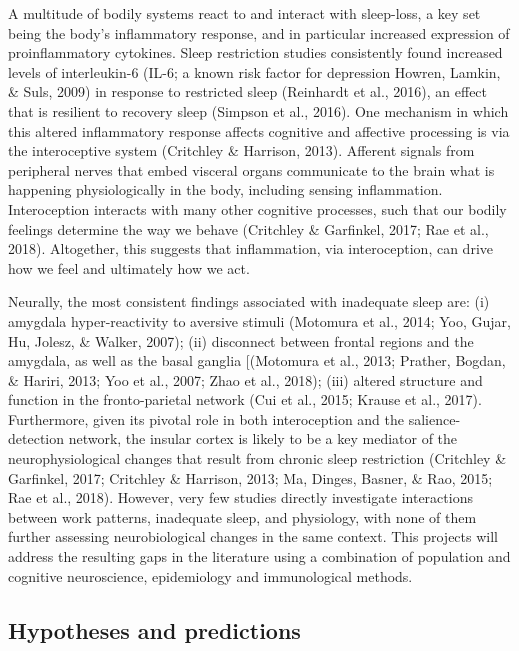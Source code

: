\documentclass[
  english,
  man]{apa6}
\begin{document}
A multitude of bodily systems react to and interact with sleep-loss, a key set being the body's inflammatory response, and in particular increased expression of proinflammatory cytokines. Sleep restriction studies consistently found increased levels of interleukin-6 (IL-6; a known risk factor for depression Howren, Lamkin, \& Suls, 2009) in response to restricted sleep (Reinhardt et al., 2016), an effect that is resilient to recovery sleep (Simpson et al., 2016). One mechanism in which this altered inflammatory response affects cognitive and affective processing is via the interoceptive system (Critchley \& Harrison, 2013). Afferent signals from peripheral nerves that embed visceral organs communicate to the brain what is happening physiologically in the body, including sensing inflammation. Interoception interacts with many other cognitive processes, such that our bodily feelings determine the way we behave (Critchley \& Garfinkel, 2017; Rae et al., 2018). Altogether, this suggests that inflammation, via interoception, can drive how we feel and ultimately how we act.

Neurally, the most consistent findings associated with inadequate sleep are: (i) amygdala hyper-reactivity to aversive stimuli (Motomura et al., 2014; Yoo, Gujar, Hu, Jolesz, \& Walker, 2007); (ii) disconnect between frontal regions and the amygdala, as well as the basal ganglia {[}(Motomura et al., 2013; Prather, Bogdan, \& Hariri, 2013; Yoo et al., 2007; Zhao et al., 2018); (iii) altered structure and function in the fronto-parietal network (Cui et al., 2015; Krause et al., 2017). Furthermore, given its pivotal role in both interoception and the salience-detection network, the insular cortex is likely to be a key mediator of the neurophysiological changes that result from chronic sleep restriction (Critchley \& Garfinkel, 2017; Critchley \& Harrison, 2013; Ma, Dinges, Basner, \& Rao, 2015; Rae et al., 2018). However, very few studies directly investigate interactions between work patterns, inadequate sleep, and physiology, with none of them further assessing neurobiological changes in the same context. This projects will address the resulting gaps in the literature using a combination of population and cognitive neuroscience, epidemiology and immunological methods.

\hypertarget{hypotheses-and-predictions}{%
\subsection{Hypotheses and predictions}\label{hypotheses-and-predictions}}
\end{document}
